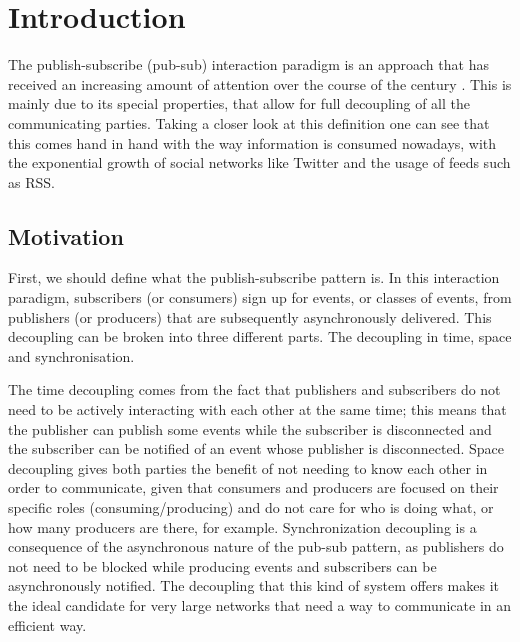 
\chapter{Introduction}
\label{chapter:introduction}

The publish-subscribe (pub-sub) interaction paradigm is an approach that has
received an increasing amount of attention over the course of the century
\cite{Kermarrec2013} \cite{Eugster2003}.  This is mainly due to its special
properties, that allow for full decoupling of all the communicating parties.
Taking a closer look at this definition one can see that this comes hand in
hand with the way information is consumed nowadays, with the exponential growth
of social networks like Twitter and the usage of feeds such as RSS.


\section{Motivation}
First, we should define what the publish-subscribe pattern is.  In this
interaction paradigm, subscribers (or consumers) sign up for events, or classes
of events, from publishers (or producers) that are subsequently asynchronously
delivered. This decoupling can be broken into three different parts. The
decoupling in time, space and synchronisation.

The time decoupling comes from the fact that publishers and subscribers do not
need to be actively interacting with each other at the same time; this means
that the publisher can publish some events while the subscriber is disconnected
and the subscriber can be notified of an event whose publisher is disconnected.
Space decoupling gives both parties the benefit of not needing to know each
other in order to communicate, given that consumers and producers are focused
on their specific roles (consuming/producing) and do not care for who is doing
what, or how many producers are there, for example. Synchronization decoupling is a
consequence of the asynchronous nature of the pub-sub pattern, as publishers do
not need to be blocked while producing events and subscribers can be
asynchronously notified.  The decoupling that this kind of system offers makes
it the ideal candidate for very large networks that need a way to communicate
in an efficient way.

